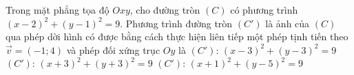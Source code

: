 \begin{ex}%
Trong mặt phẳng tọa độ $Oxy$, cho đường tròn $(C)$ có phương trình $(x-2)^2+(y-1)^2=9$. Phương trình đường tròn $(C')$ là ảnh của $(C)$ qua phép dời hình có được bằng cách thực hiện liên tiếp một phép tịnh tiến theo $\overrightarrow{v}=(-1;4)$ và phép đối xứng trục $Oy$ là
{$(C')$: $(x-3)^2+(y-3)^2=9$}
{$(C')$: $(x+3)^2+(y+3)^2=9$}
{\True $(C')$: $(x+1)^2+(y-5)^2=9$}
\end{ex}

